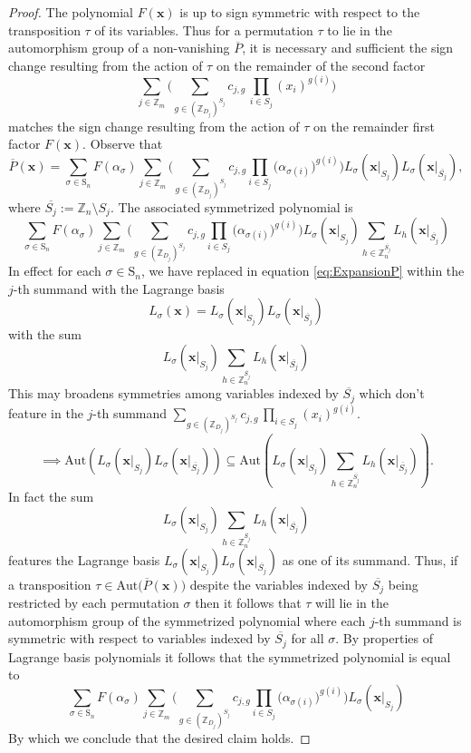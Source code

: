\begin{proof}
The polynomial $F(\mathbf{x})$ is up to sign symmetric with respect to the transposition $\tau$ of its variables. Thus for a permutation $\tau$ to lie in the automorphism group of a non-vanishing $\overline{P}$, it is necessary and sufficient the sign change resulting from the action of $\tau$ on the remainder of the second factor
\[
\sum_{j\in\mathbb{Z}_{m}}\big(\sum_{g\in(\mathbb{Z}_{D_{j}})^{S_{j}}}c_{j,g}\,\prod_{i\in S_{j}}(x_{i})^{g(i)}\big)
\]
matches the sign change resulting from the action of $\tau$ on the remainder first factor $F(\mathbf{x})$. Observe that
\begin{equation}\label{eq:ExpansionP}
\overline{P}(\mathbf{x})=\sum_{\sigma\in\text{S}_{n}}F(\alpha_{\sigma})\sum_{j\in\mathbb{Z}_{m}}\bigg(\sum_{g\in(\mathbb{Z}_{D_{j}})^{S_{j}}}c_{j,g}\prod_{i\in S_{j}}\big(\alpha_{\sigma(i)}\big)^{g(i)}\bigg)L_{\sigma}(\mathbf{x}|_{S_{j}})L_{\sigma}(\mathbf{x}|_{\overline{S_{j}}}),
\end{equation}
where $\overline{S_{j}}:=\mathbb{Z}_n\setminus S_{j}$. The associated symmetrized polynomial is
\[
\sum_{\sigma\in\text{S}_{n}}F(\alpha_{\sigma})\sum_{j\in\mathbb{Z}_{m}}\bigg(\sum_{g\in(\mathbb{Z}_{D_{j}})^{S_{j}}}c_{j,g}\prod_{i\in S_{j}}\big(\alpha_{\sigma(i)}\big)^{g(i)}\bigg)L_{\sigma}(\mathbf{x}|_{S_{j}})\sum_{h\in\mathbb{Z}_{n}^{\overline{S_{j}}}}L_{h}(\mathbf{x}|_{\overline{S_{j}}})
\]
In effect for each $\sigma\in\text{S}_{n}$, we have replaced in equation \eqref{eq:ExpansionP} within the $j$-th summand with the Lagrange basis
\[
L_{\sigma}(\mathbf{x})=L_{\sigma}(\mathbf{x}|_{S_{j}})L_{\sigma}(\mathbf{x}|_{\overline{S_{j}}})
\]
with the sum
\[
L_{\sigma}(\mathbf{x}|_{S_{j}})\sum_{h\in\mathbb{Z}_{n}^{\overline{S_{j}}}}L_{h}(\mathbf{x}|_{\overline{S_{j}}})
\]
This may broadens symmetries among variables indexed by $\overline{S_{j}}$ which don't feature in the $j$-th summand $\underset{g\in(\mathbb{Z}_{D_{j}})^{S_{j}}}{\sum}c_{j,g}\,\underset{i\in S_{j}}{\prod}(x_{i})^{g(i)}$.
\[
\implies \textrm{Aut}\left(L_{\sigma}(\mathbf{x}|_{S_{j}})L_{\sigma}(\mathbf{x}|_{\overline{S_{j}}})\right)\subseteq\textrm{Aut}\left(L_{\sigma}(\mathbf{x}|_{S_{j}})\sum_{h\in\mathbb{Z}_{n}^{\overline{S_{j}}}}L_{h}(\mathbf{x}|_{\overline{S_{j}}})\right).
\]
In fact the sum
\[
L_{\sigma}(\mathbf{x}|_{S_{j}})\sum_{h\in\mathbb{Z}_{n}^{\overline{S_{j}}}}L_{h}(\mathbf{x}|_{\overline{S_{j}}})
\]
 features the Lagrange basis  $L_{\sigma}(\mathbf{x}|_{S_{j}})L_{\sigma}(\mathbf{x}|_{\overline{S_{j}}})$ as one of its summand. Thus, if a transposition $\tau \in \textrm{Aut}\big(\overline{P}(\mathbf{x})\big)$  despite the variables indexed by $\overline{S_j}$ being restricted by each permutation $\sigma$ then it follows that $\tau$ will lie in the automorphism group of the symmetrized polynomial where each $j$-th summand is symmetric with respect to variables indexed by $\overline{S_{j}}$  for all $\sigma$.
By properties of Lagrange basis polynomials it follows that the symmetrized polynomial is equal to
\[
\sum_{\sigma\in\text{S}_{n}}F(\alpha_{\sigma})\sum_{j\in\mathbb{Z}_{m}}\bigg(\sum_{g\in(\mathbb{Z}_{D_{j}})^{S_{j}}}c_{j,g}\prod_{i\in S_{j}}\big(\alpha_{\sigma(i)}\big)^{g(i)}\bigg)L_{\sigma}(\mathbf{x}|_{S_{j}})
\]
By which we conclude that the desired claim holds.
\end{proof}
